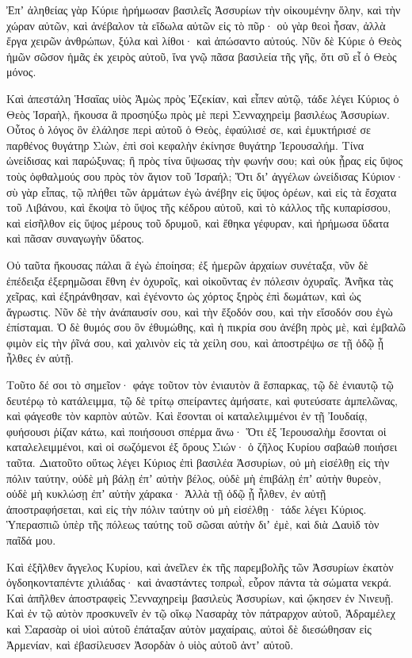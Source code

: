 {Ἐπʼ ἀληθείας γὰρ Κύριε ἠρήμωσαν βασιλεῖς Ἀσσυρίων τὴν οἰκουμένην ὅλην, καὶ τὴν χώραν αὐτῶν,
καὶ ἀνέβαλον τὰ εἴδωλα αὐτῶν εἰς τὸ πῦρ· οὐ γὰρ θεοὶ ἦσαν, ἀλλὰ ἔργα χειρῶν ἀνθρώπων, ξύλα καὶ λίθοι· καὶ ἀπώσαντο αὐτούς.
Νῦν δὲ Κύριε ὁ Θεὸς ἡμῶν σῶσον ἡμᾶς ἐκ χειρὸς αὐτοῦ, ἵνα γνῷ πᾶσα βασιλεία τῆς γῆς, ὅτι σῦ εἶ ὁ Θεὸς μόνος.
\par }{\PP {}Καὶ ἀπεστάλη Ἡσαΐας υἱὸς Ἀμὼς πρὸς Ἐζεκίαν, καὶ εἶπεν αὐτῷ, τάδε λέγει Κύριος ὁ Θεὸς Ἰσραὴλ, ἤκουσα ἃ προσηύξω πρὸς μὲ περὶ Σενναχηρεὶμ βασιλέως Ἀσσυρίων.
Οὗτος ὁ λόγος ὃν ἐλάλησε περὶ αὐτοῦ ὁ Θεὸς, ἐφαύλισέ σε, καὶ ἐμυκτήρισέ σε παρθένος θυγάτηρ Σιὼν, ἐπὶ σοὶ κεφαλὴν ἐκίνησε θυγάτηρ Ἱερουσαλήμ.
Τίνα ὠνείδισας καὶ παρώξυνας; ἢ πρὸς τίνα ὕψωσας τὴν φωνήν σου; καὶ οὐκ ᾖρας εἰς ὕψος τοὺς ὀφθαλμούς σου πρὸς τὸν ἅγιον τοῦ Ἰσραήλ;
Ὅτι διʼ ἀγγέλων ὠνείδισας Κύριον· σὺ γὰρ εἶπας, τῷ πλήθει τῶν ἁρμάτων ἐγὼ ἀνέβην εἰς ὕψος ὀρέων, καὶ εἰς τὰ ἔσχατα τοῦ Λιβάνου, καὶ ἔκοψα τὸ ὕψος τῆς κέδρου αὐτοῦ, καὶ τὸ κάλλος τῆς κυπαρίσσου, καὶ εἰσῆλθον εἰς ὕψος μέρους τοῦ δρυμοῦ,
καὶ ἔθηκα γέφυραν, καὶ ἠρήμωσα ὕδατα καὶ πᾶσαν συναγωγὴν ὕδατος.
\par }{\PP {}Οὐ ταῦτα ἤκουσας πάλαι ἃ ἐγὼ ἐποίησα; ἐξ ἡμερῶν ἀρχαίων συνέταξα, νῦν δὲ ἐπέδειξα ἐξερημῶσαι ἔθνη ἐν ὀχυροῖς, καὶ οἰκοῦντας ἐν πόλεσιν ὀχυραῖς.
Ἀνῆκα τὰς χεῖρας, καὶ ἐξηράνθησαν, καὶ ἐγένοντο ὡς χόρτος ξηρὸς ἐπὶ δωμάτων, καὶ ὡς ἄγρωστις.
Νῦν δὲ τὴν ἀνάπαυσίν σου, καὶ τὴν ἔξοδόν σου, καὶ τὴν εἴσοδόν σου ἐγὼ ἐπίσταμαι.
Ὁ δὲ θυμός σου ὃν ἐθυμώθης, καὶ ἡ πικρία σου ἀνέβη πρὸς μὲ, καὶ ἐμβαλῶ φιμὸν εἰς τὴν ῥῖνά σου, καὶ χαλινὸν εἰς τὰ χείλη σου, καὶ ἀποστρέψω σε τῇ ὁδῷ ᾗ ἦλθες ἐν αὐτῇ.
\par }{\PP {}Τοῦτο δέ σοι τὸ σημεῖον· φάγε τοῦτον τὸν ἐνιαυτὸν ἃ ἔσπαρκας, τῷ δὲ ἐνιαυτῷ τῷ δευτέρῳ τὸ κατάλειμμα, τῷ δὲ τρίτῳ σπείραντες ἀμήσατε, καὶ φυτεύσατε ἀμπελῶνας, καὶ φάγεσθε τὸν καρπὸν αὐτῶν.
Καὶ ἔσονται οἱ καταλελιμμένοι ἐν τῇ Ἰουδαίᾳ, φυήσουσι ῥίζαν κάτω, καὶ ποιήσουσι σπέρμα ἄνω·
Ὅτι ἐξ Ἱερουσαλὴμ ἔσονται οἱ καταλελειμμένοι, καὶ οἱ σωζόμενοι ἐξ ὄρους Σιών· ὁ ζῆλος Κυρίου σαβαὼθ ποιήσει ταῦτα.
Διατοῦτο οὕτως λέγει Κύριος ἐπὶ βασιλέα Ἀσσυρίων, οὐ μὴ εἰσέλθῃ εἰς τὴν πόλιν ταύτην, οὐδὲ μὴ βάλῃ ἐπʼ αὐτὴν βέλος, οὐδὲ μὴ ἐπιβάλῃ ἐπʼ αὐτὴν θυρεὸν, οὐδὲ μὴ κυκλώσῃ ἐπʼ αὐτὴν χάρακα·
Ἀλλὰ τῇ ὁδῷ ᾗ ἦλθεν, ἐν αὐτῇ ἀποστραφήσεται, καὶ εἰς τὴν πόλιν ταύτην οὐ μὴ εἰσέλθῃ· τάδε λέγει Κύριος.
Ὑπερασπιῶ ὑπὲρ τῆς πόλεως ταύτης τοῦ σῶσαι αὐτὴν διʼ ἐμὲ, καὶ διὰ Δαυὶδ τὸν παῖδά μου.
\par }{\PP {}Καὶ ἐξῆλθεν ἄγγελος Κυρίου, καὶ ἀνεῖλεν ἐκ τῆς παρεμβολῆς τῶν Ἀσσυρίων ἑκατὸν ὀγδοηκονταπέντε χιλιάδας· καὶ ἀναστάντες τοπρωῒ, εὗρον πάντα τὰ σώματα νεκρά.
Καὶ ἀπῆλθεν ἀποστραφεὶς Σενναχηρεὶμ βασιλεὺς Ἀσσυρίων, καὶ ᾤκησεν ἐν Νινευῇ.
Καὶ ἐν τῷ αὐτὸν προσκυνεῖν ἐν τῷ οἴκῳ Νασαρὰχ τὸν πάτραρχον αὐτοῦ, Ἀδραμέλεχ καὶ Σαρασὰρ οἱ υἱοὶ αὐτοῦ ἐπάταξαν αὐτὸν μαχαίραις, αὐτοὶ δὲ διεσώθησαν εἰς Ἀρμενίαν, καὶ ἐβασίλευσεν Ἀσορδὰν ὁ υἱὸς αὐτοῦ ἀντʼ αὐτοῦ.

}
